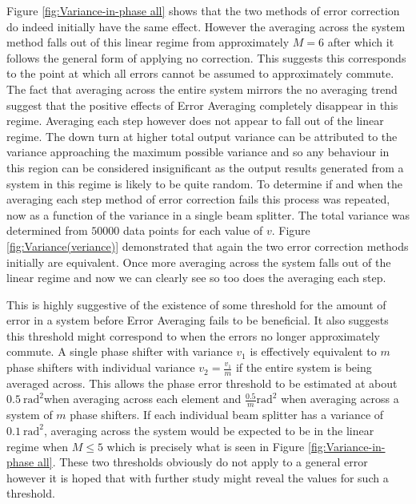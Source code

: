 \documentclass[aps,pra,twocolumn,superscriptaddress,numerical]{revtex4-1}
\begin{document}
		
		Figure \ref{fig:Variance-in-phase all} shows that the two methods of error correction do indeed initially have the same effect. However the averaging across the system method falls out of this linear regime from approximately $M=6$ after which it follows the general form of applying no correction. This suggests this corresponds to the point at which all errors cannot be assumed to approximately commute. The fact that averaging across the entire system mirrors the no averaging trend suggest that the positive effects of Error Averaging completely disappear in this regime. Averaging each step however does not appear to fall out of the linear regime. The down turn at higher total output variance can be attributed to the variance approaching the maximum possible variance and so any behaviour in this region can be considered insignificant as the output results generated from a system in this regime is likely to be quite random. To determine if and when the averaging each step method of error correction fails this process was repeated, now as a function of the variance in a single beam splitter. The total variance was determined from $50000$ data points for each value of $v$. Figure \ref{fig:Variance(veriance)} demonstrated that again the two error correction methods initially are equivalent. Once more averaging across the system falls out of the linear regime and now we can clearly see so too does the averaging each step.
		
		This is highly suggestive of the existence of some threshold for the amount of error in a system before Error Averaging fails to be beneficial. It also suggests this threshold might correspond to when the errors no longer approximately commute. A single phase shifter with variance $v_{1}$ is effectively equivalent to $m$ phase shifters with individual variance $v_{2}=\frac{v_{1}}{m}$ if the entire system is being averaged across. This allows the phase error threshold to be estimated at about $0.5\ \textrm{rad}^{2}$when averaging across each element and $\frac{0.5}{m}\textrm{rad}^{2}$ when averaging across a system of $m$ phase shifters. If each individual beam splitter has a variance of $0.1\ \textrm{rad}^{2}$, averaging across the system would be expected to be in the linear regime when $M\le5$ which is precisely what is seen in Figure \ref{fig:Variance-in-phase all}. These two thresholds obviously do not apply to a general error however it is hoped that with further study might reveal the values for such a threshold.
		
\end{document}
